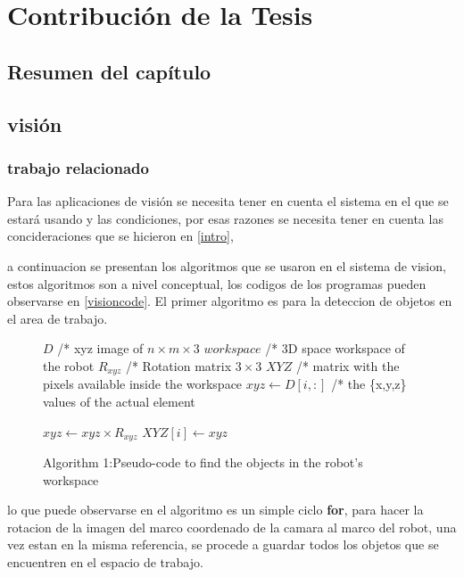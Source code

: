 \chapter{Contribución de la Tesis}

    \section{Resumen del capítulo}
    
    
    
    
    
    
    \section{visión}
    
    \subsection{trabajo relacionado}
    
    
    
    
    
    
    
    Para las aplicaciones de visión se necesita tener en cuenta el sistema en el que se estará usando y las condiciones, por esas razones se necesita tener en cuenta las concideraciones que se hicieron en \cref{intro},     
    
    
    
    
    
    
    
    
    
    
    a continuacion se presentan los algoritmos que se usaron en el sistema de vision, estos algoritmos son a nivel conceptual, los codigos de los programas pueden observarse en \cref{visioncode}.
    El primer algoritmo es para la deteccion de objetos en el area de trabajo.
    
    
    \begin{figure}[h]
    	\centering
    	\begin{algorithmic}
    		\REQUIRE $ D $ /* xyz image of $n \times m \times 3$
    		\REQUIRE $ workspace $ /* 3D space workspace of the robot
    		\REQUIRE $ R_{xyz} $ /* Rotation matrix $3\times 3$ 
    		\ENSURE $XYZ$ /* matrix with the pixels available inside the workspace
    		\STATE $xyz \leftarrow  D[i,:]$ /* the \{x,y,z\} values of the actual element
    		
    		\STATE $xyz \leftarrow xyz \times R_{xyz}$
    		\STATE $XYZ[i] \leftarrow xyz$
    		\ENDIF
    		\ENDFOR
    	\end{algorithmic}
    	\caption{Algorithm 1:Pseudo-code to find the objects in the robot's workspace}
    	\label{alg1}
    \end{figure} 
    lo que puede observarse en el algoritmo es un simple ciclo \textbf{for}, para hacer la rotacion de la imagen del marco coordenado de la camara al marco del robot, una vez estan en la misma referencia, se procede a guardar todos los objetos que se encuentren en el espacio de trabajo.
    
